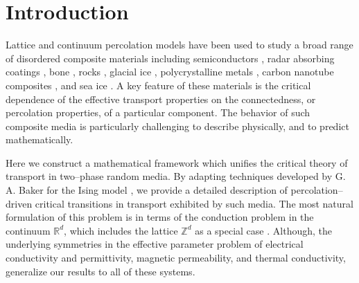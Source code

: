 \documentclass[english,12pt,jmp,graphicx]{revtex4-1}
\begin{document}

\maketitle %

%
\section{Introduction}\label{sec:Introduction}
%
Lattice and continuum percolation models have been used to study a
broad range of disordered composite materials including semiconductors 
\cite{Efros-84}, radar absorbing coatings \cite{Kusy:N-58},
bone \cite{Sasaki:JTB:25,Golden:JoB:337}, rocks
\cite{Bourbie:JGR-11524,Broadbent:PCPS-629}, 
glacial ice \cite{Enting:1985:LSM}, polycrystalline metals
\cite{Chen:PRL:2007}, carbon nanotube composites
\cite{Kyrylyuk:PNAS:2008}, and sea ice \cite{Golden:S-2238}. A key
feature of these materials is the critical dependence of the effective
transport properties on the connectedness, or percolation properties,
of a particular component. The behavior of such composite media is
particularly challenging to describe physically, and to predict
mathematically.  

Here we construct a mathematical framework which unifies the critical
theory of transport in two--phase random media. By adapting techniques
developed by G. A. Baker for the Ising model \cite{Baker-1990}, we
provide a detailed description of percolation--driven critical
transitions in transport exhibited by such media. The most natural
formulation of this problem is in terms of the conduction problem in
the continuum $\mathbb{R}^d$, which includes the lattice
$\mathbb{Z}^d$ as a special case
\cite{Golden:JMP-5627,Golden:CMP-473}. Although, the underlying
symmetries \cite{MILTON:2002:TC} in the effective parameter problem of 
electrical conductivity and permittivity, magnetic permeability, and
thermal conductivity, generalize our results to all of these systems.     
\end{document}
